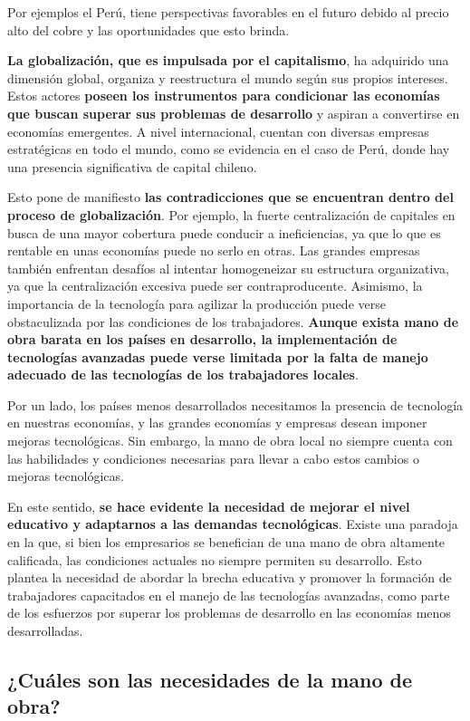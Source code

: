 \documentclass[
  jou,
  floatsintext,
  longtable,
  a4paper,
  nolmodern,
  notxfonts,
  notimes,
  12pt,
  colorlinks=true,linkcolor=blue,citecolor=blue,urlcolor=blue]{apa7}
\begin{document}
Por ejemplos el Perú, tiene perspectivas favorables en el futuro debido
al precio alto del cobre y las oportunidades que esto brinda.

\textbf{La globalización, que es impulsada por el capitalismo}, ha
adquirido una dimensión global, organiza y reestructura el mundo según
sus propios intereses. Estos actores \textbf{poseen los instrumentos
para condicionar las economías que buscan superar sus problemas de
desarrollo} y aspiran a convertirse en economías emergentes. A nivel
internacional, cuentan con diversas empresas estratégicas en todo el
mundo, como se evidencia en el caso de Perú, donde hay una presencia
significativa de capital chileno.

Esto pone de manifiesto \textbf{las contradicciones que se encuentran
dentro del proceso de globalización}. Por ejemplo, la fuerte
centralización de capitales en busca de una mayor cobertura puede
conducir a ineficiencias, ya que lo que es rentable en unas economías
puede no serlo en otras. Las grandes empresas también enfrentan desafíos
al intentar homogeneizar su estructura organizativa, ya que la
centralización excesiva puede ser contraproducente. Asimismo, la
importancia de la tecnología para agilizar la producción puede verse
obstaculizada por las condiciones de los trabajadores. \textbf{Aunque
exista mano de obra barata en los países en desarrollo, la
implementación de tecnologías avanzadas puede verse limitada por la
falta de manejo adecuado de las tecnologías de los trabajadores
locales}.

Por un lado, los países menos desarrollados necesitamos la presencia de
tecnología en nuestras economías, y las grandes economías y empresas
desean imponer mejoras tecnológicas. Sin embargo, la mano de obra local
no siempre cuenta con las habilidades y condiciones necesarias para
llevar a cabo estos cambios o mejoras tecnológicas.

En este sentido, \textbf{se hace evidente la necesidad de mejorar el
nivel educativo y adaptarnos a las demandas tecnológicas}. Existe una
paradoja en la que, si bien los empresarios se benefician de una mano de
obra altamente calificada, las condiciones actuales no siempre permiten
su desarrollo. Esto plantea la necesidad de abordar la brecha educativa
y promover la formación de trabajadores capacitados en el manejo de las
tecnologías avanzadas, como parte de los esfuerzos por superar los
problemas de desarrollo en las economías menos desarrolladas.

\subsection{¿Cuáles son las necesidades de la mano de
obra?}\label{cuuxe1les-son-las-necesidades-de-la-mano-de-obra}
\end{document}
